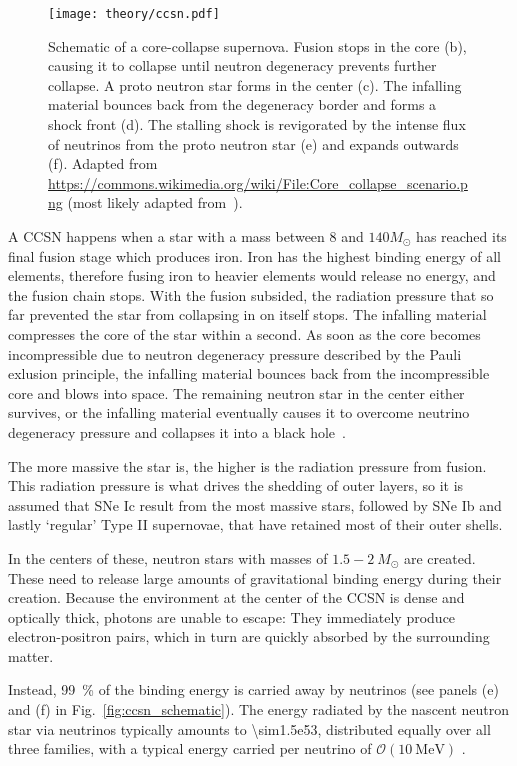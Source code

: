\begin{figure}[htb]
    \texttt{[image: theory/ccsn.pdf]}
    \caption[Core-collapse supernova]{Schematic of a core-collapse supernova. Fusion stops in the core (b), causing it to collapse until neutron degeneracy prevents further collapse. A proto neutron star forms in the center (c). The infalling material bounces back from the degeneracy border and forms a shock front (d). The stalling shock is revigorated by the intense flux of neutrinos from the proto neutron star (e) and expands outwards (f). Adapted from \url{https://commons.wikimedia.org/wiki/File:Core_collapse_scenario.png} (most likely adapted from~\cite{Janka2012}).}
\end{figure}

A CCSN happens when a star with a mass between $8$ and $140 M_\odot$ has reached its final fusion stage which produces iron. Iron has the highest binding energy of all elements, therefore fusing iron to heavier elements would release no energy, and the fusion chain stops. With the fusion subsided, the radiation pressure that so far prevented the star from collapsing in on itself stops. The infalling material compresses the core of the star within a second. As soon as the core becomes incompressible due to neutron degeneracy pressure described by the Pauli exlusion principle, the infalling material bounces back from the incompressible core and blows into space. The remaining neutron star in the center either survives, or the infalling material eventually causes it to overcome neutrino degeneracy pressure and collapses it into a black hole~\cite{Alsabti2017}.

The more massive the star is, the higher is the radiation pressure from fusion. This radiation pressure is what drives the shedding of outer layers, so it is assumed that SNe Ic result from the most massive stars, followed by SNe Ib and lastly `regular' Type II supernovae, that have retained most of their outer shells.

In the centers of these, neutron stars with masses of $1.5-2~M_\odot$ are created. These need to release large amounts of gravitational binding energy during their creation. Because the environment at the center of the CCSN is dense and optically thick, photons are unable to escape: They immediately produce electron-positron pairs, which in turn are quickly absorbed by the surrounding matter.

Instead, \SI{99}{\percent} of the binding energy is carried away by neutrinos (see panels (e) and (f) in Fig.~\ref{fig:ccsn_schematic}). The energy radiated by the nascent neutron star via neutrinos typically amounts to \SI{\sim1.5e53}{\erg}, distributed equally over all three families, with a typical energy carried per neutrino of $\mathcal{O}(\SI{10}{\mega\eV})$ .

